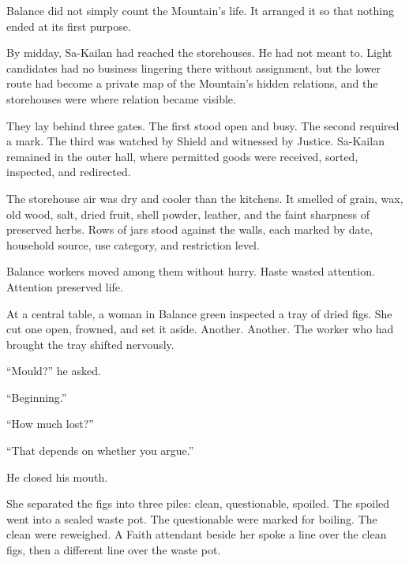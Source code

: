 Balance did not simply count the Mountain’s life.
It arranged it so that nothing ended at its first purpose.\par

By midday, Sa-Kailan had reached the storehouses.
He had not meant to.
Light candidates had no business lingering there without assignment, but the lower route had become a private map of the Mountain’s hidden relations, and the storehouses were where relation became visible.\par

They lay behind three gates.
The first stood open and busy.
The second required a mark.
The third was watched by Shield and witnessed by Justice.
Sa-Kailan remained in the outer hall, where permitted goods were received, sorted, inspected, and redirected.\par

The storehouse air was dry and cooler than the kitchens.
It smelled of grain, wax, old wood, salt, dried fruit, shell powder, leather, and the faint sharpness of preserved herbs.
Rows of jars stood against the walls, each marked by date, household source, use category, and restriction level.\par

Balance workers moved among them without hurry.
Haste wasted attention.
Attention preserved life.\par

At a central table, a woman in Balance green inspected a tray of dried figs.
She cut one open, frowned, and set it aside.
Another.
Another.
The worker who had brought the tray shifted nervously.\par

“Mould?” he asked.\par

“Beginning.”\par

“How much lost?”\par

“That depends on whether you argue.”\par

He closed his mouth.\par

She separated the figs into three piles: clean, questionable, spoiled.
The spoiled went into a sealed waste pot.
The questionable were marked for boiling.
The clean were reweighed.
A Faith attendant beside her spoke a line over the clean figs, then a different line over the waste pot.\par

